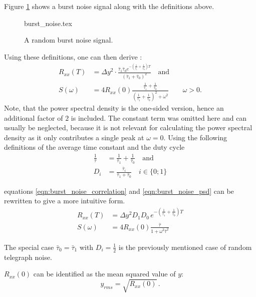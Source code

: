 Figure \ref{fig:burst_noise} shows a burst noise signal along with the definitions above.
\begin{figure}[hb]
    \centering
        {burst_noise.tex}
    \caption{A random burst noise signal.}
    \label{fig:burst_noise}
\end{figure}

Using these definitions, one can then derive \cite{burst_noise_wiener_khinchin}:
\begin{align}
    R_{xx}(T) &= \Delta y^2 \cdot \frac{\bar \tau_1 \bar \tau_0 e^{-\left(\frac{1}{\bar \tau_1}+\frac{1}{\bar \tau_0}\right)T}}{\left(\bar \tau_1 + \bar \tau_0\right)^2} \quad \text{and} \label{eqn:burst_noise_correlation}\\
    S(\omega) &= 4 R_{xx}(0) \frac{\frac{1}{\bar \tau_1} + \frac{1}{\bar \tau_0}}{\left(\frac{1}{\bar \tau_1} + \frac{1}{\bar \tau_0}\right)^2 + \omega^2} \qquad \omega > 0 . \label{eqn:burst_noise_psd}
\end{align}
Note, that the power spectral density is the one-sided version, hence an additional factor of $2$ is included. The constant term was omitted here and can usually be neglected, because it is not relevant for calculating the power spectral density as it only contributes a single peak at $\omega=0$. Using the following definitions of the average time constant and the duty cycle
\begin{align}
    \frac{1}{\bar \tau} &= \frac{1}{\bar \tau_1} + \frac{1}{\bar \tau_0} \quad \mathrm{and} \label{eqn:definition_bar_tau}\\
    D_i &= \frac{\bar \tau_i}{\bar \tau_1 + \bar \tau_0} \quad i \in \{0 ; 1\}
\end{align}

equations \ref{eqn:burst_noise_correlation} and \ref{eqn:burst_noise_psd} can be rewritten to give a more intuitive form.
\begin{align}
    R_{xx}(T) &= \Delta y^2 D_1 D_0 \, e^{-\left(\frac{1}{\bar \tau_1}+\frac{1}{\bar \tau_0}\right)T}\\
    S(\omega) &= 4 R_{xx}(0) \frac{\bar \tau}{1 + \omega^2 \bar \tau^2} \label{eqn:burst_noise_lorentzian}
\end{align}

The special case $\bar \tau_0 = \bar \tau_1$ with $D_i=\frac 1 2$ is the previously mentioned case of random telegraph noise.

$R_{xx}(0)$ can be identified as the mean squared value of $y$:
\begin{equation}
    y_{rms} = \sqrt{R_{xx}(0)} \,.
\end{equation}

